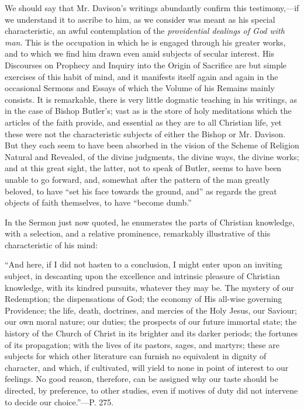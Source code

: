 We should say that Mr. Davison's writings
abundantly confirm this testimony,—if we understand it to ascribe to
him, as we consider was meant as his special characteristic, an awful
contemplation of the \emph{providential dealings of God with man}.
This is the occupation in which he is engaged through his greater
works, and to which we find him drawn even amid subjects of secular
interest. His Discourses on Prophecy and Inquiry into the Origin of
Sacrifice are but simple exercises of this habit of mind, and it
manifests itself again and again in the occasional Sermons and Essays
of which the Volume of his Remains mainly consists. It is remarkable,
there is very little dogmatic teaching in his writings, as in the case
of Bishop Butler's; vast as is the store of holy meditations which the
articles of the faith provide, and essential as they are to all
Christian life, yet these were not the characteristic subjects of
either the Bishop or Mr. Davison. But they each seem to have been
absorbed in the vision of the Scheme of Religion Natural and Revealed,
of the divine judgments, the divine ways, the divine works; and at
this great sight, the latter, not to speak of Butler, seems to have
been unable to go forward, and, somewhat after the pattern of the man
greatly beloved, to have ``set his face towards the ground, and'' as
regards the great objects of faith themselves, to have ``become dumb.''

In the Sermon just now quoted, he enumerates the
parts of Christian knowledge, with a selection, and a relative
prominence, remarkably illustrative of this characteristic of his
mind:

``And
here, if I did not hasten to a conclusion, I might enter upon an
inviting subject, in descanting upon the excellence and intrinsic
pleasure of Christian knowledge, with its kindred pursuits, whatever
they may be. The mystery of our Redemption; the dispensations
of God; the economy of His
all-wise governing Providence; the life, death, doctrines, and mercies
of the Holy Jesus, our Saviour; our own moral nature; our duties; the
prospects of our future immortal state; the history of the Church of
Christ in its brighter and its darker periods; the fortunes of its
propagation; with the lives of its pastors, sages, and martyrs; these
are subjects for which other literature can furnish no equivalent in
dignity of character, and which, if cultivated, will yield to none in
point of interest to our feelings. No good reason, therefore, can be
assigned why our taste should be directed, by preference, to other
studies, even if motives of duty did not intervene to decide our
choice.''—P. 275.

